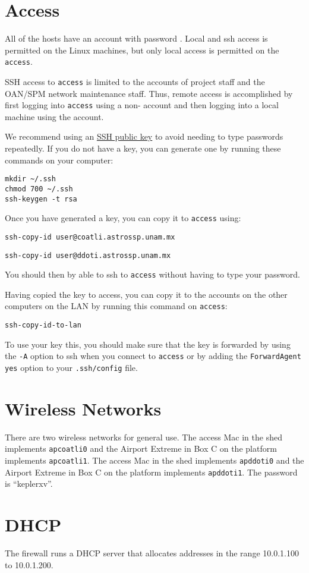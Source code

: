 \section{Access}

All of the hosts have an account {\projectaccount} with password {\projectaccount}. Local and ssh access is permitted on the Linux machines, but only local access is permitted on the \verb|access|.

SSH access to \verb|access| is limited to the accounts of project staff and the OAN/SPM network maintenance staff. Thus, remote access is accomplished by first logging into \verb|access| using a non-{\projectaccount} account and then logging into a local machine using the {\projectaccount} account.

We recommend using an \href{https://help.ubuntu.com/community/SSH/OpenSSH/Keys}{SSH public key} to avoid needing to type passwords repeatedly. If you do not have a key, you can generate one by running these commands on your computer:
\begin{verbatim}
mkdir ~/.ssh
chmod 700 ~/.ssh
ssh-keygen -t rsa
\end{verbatim}
Once you have generated a key, you can copy it to \verb|access| using:
\ifcoatlioan
\begin{verbatim}
ssh-copy-id user@coatli.astrossp.unam.mx
\end{verbatim}
\fi
\ifddotioan
\begin{verbatim}
ssh-copy-id user@ddoti.astrossp.unam.mx
\end{verbatim}
\fi
You should then by able to ssh to \verb|access| without having to type your password.

Having copied the key to access, you can copy it to the {\projectaccount} accounts on the other computers on the LAN by running this command on \verb|access|:
\begin{verbatim}
ssh-copy-id-to-lan
\end{verbatim}
To use your key this, you should make sure that the key is forwarded by using the \verb|-A| option to ssh when you connect to \verb|access| or by adding the \verb|ForwardAgent yes| option to your \verb|.ssh/config| file.

\section{Wireless Networks}

There are two wireless networks for general use. 
\ifcoatlioan
The access Mac in the shed implements \verb|apcoatli0| and the Airport Extreme in Box C on the platform implements \verb|apcoatli1|. 
\fi
\ifddotioan
The access Mac in the shed implements \verb|apddoti0| and the Airport Extreme in Box C on the platform implements \verb|apddoti1|. 
\fi
The password is “keplerxv”.

\section{DHCP}

The firewall runs a DHCP server that allocates addresses in the range 10.0.1.100 to 10.0.1.200.


